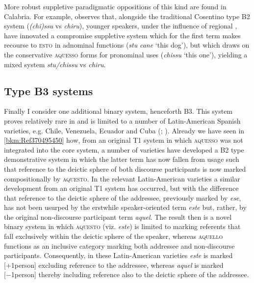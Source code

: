 \documentclass[output=paper]{langsci/langscibook}
\begin{document}
More robust suppletive paradigmatic oppositions of this kind are found in
Calabria. For example, \citet[107]{ledgeway2004sviluppo} observes that,
alongside the traditional Cosentino type B\textsc{2}\textsc{} system
(\emph{(chi)ssu} vs \emph{chiru}), younger speakers, under the influence of
regional , have innovated a compromise suppletive system which for the
first term makes recourse to \textsc{esto} in adnominal functions (\emph{stu}
\emph{cane} ‘this dog’), but which draws on the conservative \textsc{aquesso}
forms for pronominal uses (\emph{chissu} ‘this one’), yielding a mixed system
\emph{stu/chissu} vs \emph{chiru}.

\subsection{Type B3 systems}

Finally I consider one additional binary system, henceforth B3. This system\linebreak
proves relatively rare in  and is limited to a number of Latin-American
Spanish varieties, e.g. Chile, Venezuela, Ecuador and Cuba
(\citealt[434]{Zamora-Vicente:1967a}; \citealt[171]{Bruyne:1995a}). Already we
have seen in \cref{bkm:Ref370495450} how, from an original T1 system in which
\textsc{aquesso} was not integrated into the core system, a number of 
varieties have developed a B2 type demonstrative system in which the
latter term has now fallen from usage such that reference to the deictic sphere
of both discourse participants is now marked compositionally by
\textsc{aquesto}. In the relevant Latin-American  varieties a similar
development from an original T1 system has occurred, but with the difference
that reference to the deictic sphere of the addressee, previously marked by
\emph{ese}, has not been usurped by the erstwhile speaker-oriented term
\emph{este} but, rather, by the original non-discourse participant term
\emph{aquel}. The result then is a novel binary system in which
\textsc{aquesto} (viz. \emph{este}) is limited to marking referents that fall
exclusively within the deictic sphere of the speaker, whereas \textsc{aquello}
functions as an inclusive category marking both addressee and non-discourse
participants. Consequently, in these Latin-American varieties \emph{este} is
marked [+1person] excluding reference to the addressee, whereas \emph{aquel} is
marked [−1person] thereby including reference also to the deictic sphere of the
addressee.
\end{document}
